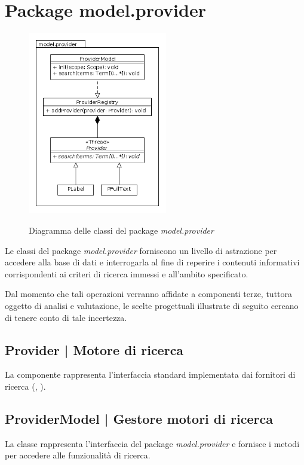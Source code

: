 \documentclass[10pt,a4paper,headinclude,footinclude,hidelinks]{scrreprt} %
\begin{document}
	\section{Package model.provider}
	\label{sec:stage:design:model.provider}

	\begin{figure}[ht]
		\begin{center}
	    	\includegraphics[height=8cm]{class/model_provider.png}
			\label{gfx:class:model:provider}
			\caption{Diagramma delle classi del package \textit{model.provider}}
		\end{center}
	\end{figure}

	Le classi del package \textit{model.provider} forniscono un livello di astrazione per accedere alla base di dati e interrogarla al fine di reperire i contenuti informativi corrispondenti ai criteri di ricerca immessi e all'ambito specificato.

	Dal momento che tali operazioni verranno affidate a componenti terze, tuttora oggetto di analisi e valutazione, le scelte progettuali illustrate di seguito cercano di tenere conto di tale incertezza.

	\subsection[Provider]{Provider | Motore di ricerca}
	\label{sec:stage:design:model.search:search-provider}
	La componente rappresenta l'interfaccia standard implementata dai fornitori di ricerca (\textit{}, \textit{}).

	\subsection[ProviderModel]{ProviderModel | Gestore motori di ricerca}
	\label{sec:stage:design:model.search:provider-model}
	La classe \textit{} rappresenta l'interfaccia del package \textit{model.provider} e fornisce i metodi per accedere alle funzionalità di ricerca.
\end{document}
